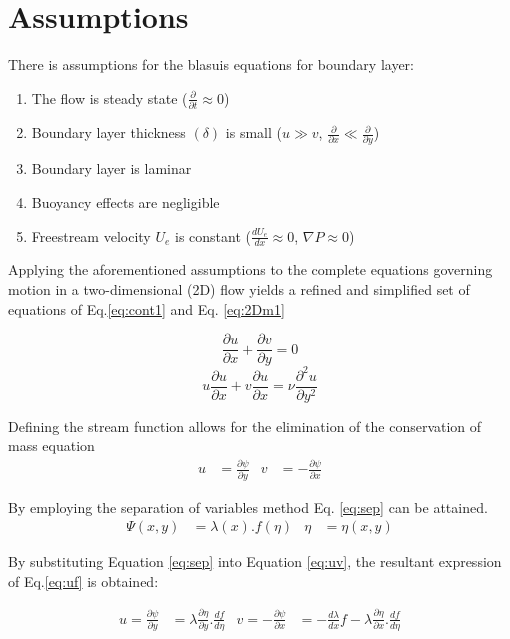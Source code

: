 \documentclass[]{report}
\begin{document}
\section{Assumptions}
There is assumptions for the blasuis equations for boundary layer:


\begin{enumerate}
    \item The flow is steady state ($\frac{\partial}{\partial t} \approx 0$)
    \item Boundary layer thickness $(\delta)$ is small ($u \gg v$, $\frac{\partial}{\partial x} \ll \frac{\partial}{\partial y}$)
    \item Boundary layer is laminar
    \item Buoyancy effects are negligible 
    \item Freestream velocity $U_e$ is constant ($\frac{dU_e}{dx} \approx 0$, $\nabla P \approx 0$)
\end{enumerate}

Applying the aforementioned assumptions to the complete equations governing motion in a two-dimensional (2D) flow yields a refined and simplified set of equations of Eq.\ref{eq:cont1} and Eq. \ref{eq:2Dm1}

\begin{equation}
\label{eq:cont1}
    \frac{\partial u}{\partial x} + \frac{\partial v}{\partial y} = 0
\end{equation}
\begin{equation}
\label{eq:2Dm1}
    u\frac{\partial u}{\partial x} + v\frac{\partial u}{\partial x} =\nu \frac{\partial ^2 u}{\partial y^2}
\end{equation}

Defining the stream function allows for the elimination of the conservation of mass equation
\begin{align}
    \label{eq:uv}
        u &= \frac{\partial \psi}{\partial y}    &       v &= -\frac{\partial \psi}{\partial x}
\end{align}

By employing the separation of variables method Eq. \ref{eq:sep}  can be attained.
\begin{align}
    \label{eq:sep}
        \Psi(x,y) &= \lambda(x).f(\eta)      &        \eta &= \eta(x,y)
\end{align}


By substituting Equation \ref{eq:sep} into Equation \ref{eq:uv}, the resultant expression of Eq.\ref{eq:uf} is obtained:

\begin{align}
\label{eq:uf}
    u = \frac{\partial \psi}{\partial y} &= \lambda \frac{\partial \eta}{\partial y}.\frac{df}{d \eta} &
        v = - \frac{\partial \psi}{\partial x} &= -\frac{d\lambda}{dx}f - \lambda \frac{\partial \eta}{\partial x}.\frac{df}{d\eta}
\end{align}
\end{document}
